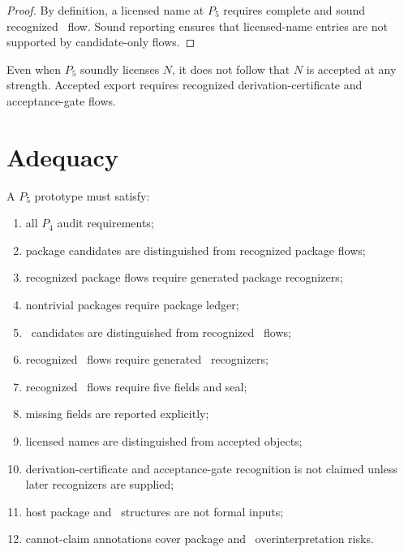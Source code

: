 \begin{proof}
By definition, a licensed name at $P_5$ requires complete and sound recognized \NameCert\ flow. Sound reporting ensures that licensed-name entries are not supported by candidate-only flows.
\end{proof}

\begin{corollary}
\label{cor:pkg-namecert-licensed-not-export}
Even when $P_5$ soundly licenses $N$, it does not follow that $N$ is accepted at any strength. Accepted export requires recognized derivation-certificate and acceptance-gate flows.
\end{corollary}

\section{Adequacy}
\label{sec:pkg-namecert-adequacy}

\begin{definition}
\label{def:pkg-namecert-p5-audit}
A $P_5$ prototype must satisfy:
\begin{enumerate}
\item all $P_4$ audit requirements;
\item package candidates are distinguished from recognized package flows;
\item recognized package flows require generated package recognizers;
\item nontrivial packages require package ledger;
\item \NameCert\ candidates are distinguished from recognized \NameCert\ flows;
\item recognized \NameCert\ flows require generated \NameCert\ recognizers;
\item recognized \NameCert\ flows require five fields and seal;
\item missing fields are reported explicitly;
\item licensed names are distinguished from accepted objects;
\item derivation-certificate and acceptance-gate recognition is not claimed unless later recognizers are supplied;
\item host package and \NameCert\ structures are not formal inputs;
\item cannot-claim annotations cover package and \NameCert\ overinterpretation risks.
\end{enumerate}
\end{definition}

